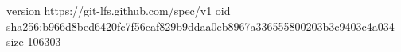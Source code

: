version https://git-lfs.github.com/spec/v1
oid sha256:b966d8bed6420fc7f56caf829b9ddaa0eb8967a336555800203b3c9403c4a034
size 106303
